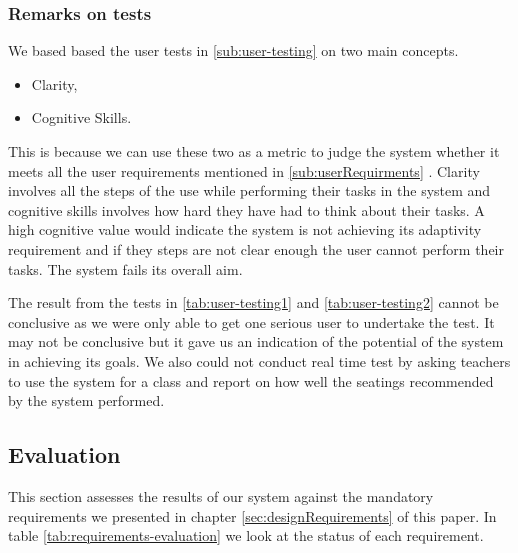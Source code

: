 \subsubsection{Remarks on tests}
We based based the user tests in  \ref{sub:user-testing} on two main concepts.
\begin{itemize}
    \item Clarity,
    \item Cognitive Skills.
\end{itemize}
This is because we can use these two as a metric to judge the system whether it meets all the user requirements mentioned in \ref{sub:userRequirments} . Clarity involves all the steps of the use while performing their tasks in the system and cognitive skills involves how hard they have had to think about their tasks. A high cognitive value would indicate the system is not achieving its adaptivity requirement and if they steps are not clear enough the user cannot perform their tasks. The system fails its overall aim.

The result from the tests in \ref{tab:user-testing1} and \ref{tab:user-testing2} cannot be conclusive as we were only able to get one serious user to undertake the test. It may not be conclusive but it gave us an indication of the potential of the system in achieving its goals. We also could not conduct real time test by asking teachers to use the system for a class and report on how well the seatings recommended by the system performed.

\subsection{Evaluation}
This section assesses the results of our system against the mandatory requirements we presented in chapter \ref{sec:designRequirements} of this paper. In table \ref{tab:requirements-evaluation} we look at the status of each requirement.
